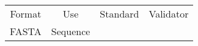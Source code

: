 \begin{tabular}{cccc}
{Format} & {Use} & {Standard} & {Validator} \\
FASTA & Sequence 
\end{tabular}
